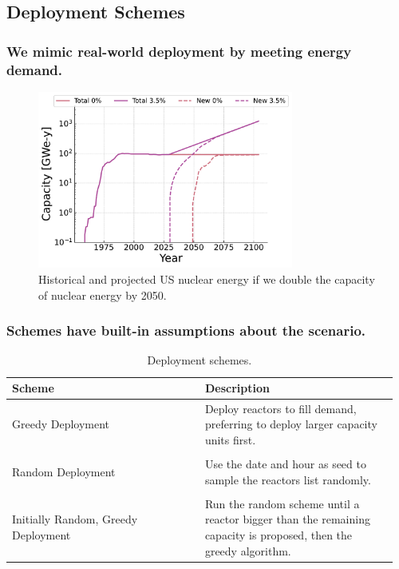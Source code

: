 \documentclass[9pt]{beamer}
\begin{document}
  \subsection{Deployment Schemes}
  \begin{frame}
    \frametitle{We mimic real-world deployment by meeting energy demand.}
    \begin{figure}
      \centering
      \includegraphics[width=0.75\textwidth]{images/new_capacity_ng_d2.pdf}
      \caption{Historical and projected US nuclear energy if we double the capacity of nuclear energy by 2050.}
    \end{figure}
  \end{frame}

  \begin{frame}
    \frametitle{Schemes have built-in assumptions about the scenario.}
    \begin{table}[H]
      \centering
      \caption{Deployment schemes.}
      \label{tab:deployment_schemes}
      \newcommand{\ColWidth}{0.48\linewidth}
      \begin{tabular}{p{\ColWidth} p{\ColWidth}}
          \hline
          Scheme & Description \\
          \hline
          Greedy Deployment & Deploy reactors to fill demand, preferring to deploy larger capacity units first. \\
          \vspace{1.5mm}\\
          Random Deployment & Use the date and hour as seed to sample the
          reactors list randomly. \\
          \vspace{1.5mm}\\
          Initially Random, Greedy Deployment & Run the random scheme until
          a reactor bigger than the remaining capacity is proposed,
          then the greedy algorithm. \\
          \hline
      \end{tabular}
    \end{table}
  \end{frame}
\end{document}
